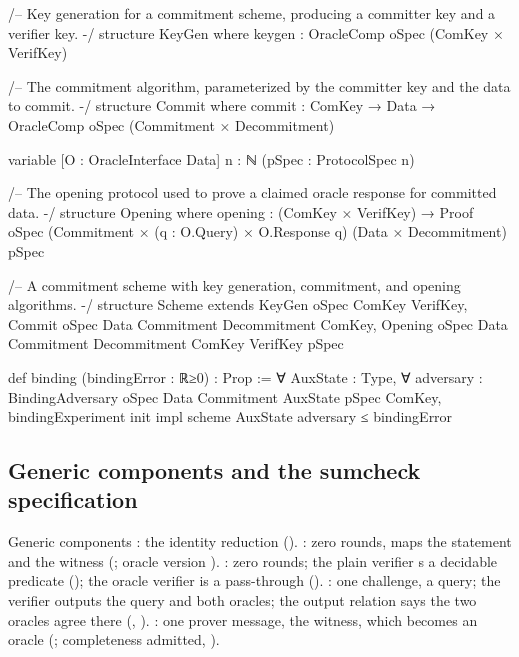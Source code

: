 \begin{leancode}
/-- Key generation for a commitment scheme, producing a committer key and a verifier key. -/
structure KeyGen where
  keygen : OracleComp oSpec (ComKey × VerifKey)

/-- The commitment algorithm, parameterized by the committer key and the data to commit. -/
structure Commit where
  commit : ComKey → Data → OracleComp oSpec (Commitment × Decommitment)

variable [O : OracleInterface Data] {n : ℕ} (pSpec : ProtocolSpec n)

/-- The opening protocol used to prove a claimed oracle response for committed data. -/
structure Opening where
  opening : (ComKey × VerifKey) →
    Proof oSpec (Commitment × (q : O.Query) × O.Response q) (Data × Decommitment) pSpec

/-- A commitment scheme with key generation, commitment, and opening algorithms. -/
structure Scheme extends
    KeyGen oSpec ComKey VerifKey,
    Commit oSpec Data Commitment Decommitment ComKey,
    Opening oSpec Data Commitment Decommitment ComKey VerifKey pSpec
\end{leancode}



\begin{leancode}
def binding (bindingError : ℝ≥0) : Prop :=
  ∀ AuxState : Type,
  ∀ adversary : BindingAdversary oSpec Data Commitment AuxState pSpec ComKey,
    bindingExperiment init impl scheme AuxState adversary ≤ bindingError
\end{leancode}


\subsection{Generic components and the sumcheck specification}\label{sec:gen-lib-ark-components}

\begin{define}{Generic components}
: the identity reduction (\allowbreak{}\allowbreak{}).
: zero rounds, maps the statement and the witness (;
oracle version ). : zero rounds; the plain verifier
s a decidable predicate (); the oracle verifier is a
pass-through (). : one challenge, a query; the verifier outputs
the query and both oracles; the output relation says the two oracles agree there
(, ). : one prover message, the
witness, which becomes an oracle (; completeness admitted,
).
\end{define}

